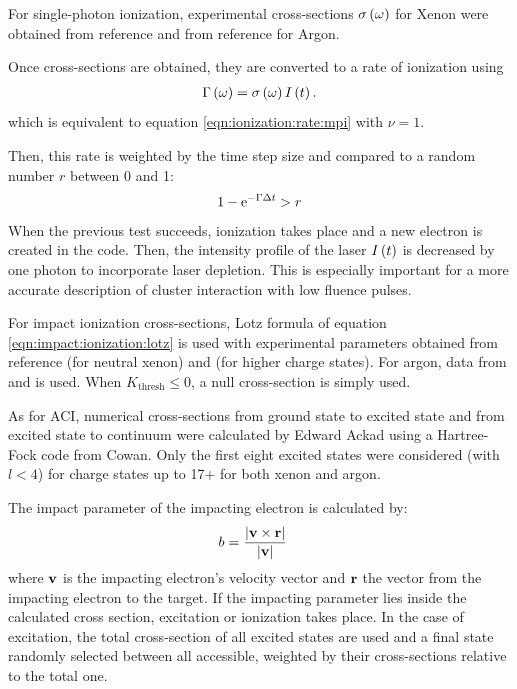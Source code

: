 
For single-photon ionization, experimental cross-sections $\sigma\left( \omega \right)$
for Xenon were obtained from reference \cite{West1978} and from
reference \cite{Marr1976} for Argon.

Once cross-sections are obtained, they are converted to a rate of ionization
using
\begin{align}
\Gamma\left( \omega \right) = \sigma\left( \omega \right) I\left( t \right).
\label{eqn:ionization:rate:single}
\end{align}
which is equivalent to equation \eqref{eqn:ionization:rate:mpi} with $\nu = 1$.

Then, this rate is weighted\cite{Lax2006} by the time step size and compared to
a random number $r$ between 0 and 1:
\begin{align}
1 - \textrm{e}^{-\Gamma \Delta t} > r
\label{eqn:ionization:prob}
\end{align}
When the previous test succeeds, ionization takes place and a new electron is
created in the code.
Then, the intensity profile of the laser $I\left( t \right)$ is decreased
by one photon
%
to incorporate laser depletion. This is especially important
for a more accurate description of cluster interaction with low fluence pulses.



For impact ionization cross-sections, Lotz formula of equation
\eqref{eqn:impact:ionization:lotz} is used with experimental parameters obtained
from reference \cite{Tawara1987} (for neutral xenon)
and \cite{Heidenreich2005} (for higher charge states).
For argon, data from \cite{Lotz1967} and \cite{Lotz1970} is used.
When $K_{\textrm{thresh}} \le 0$, a null cross-section is simply used.

As for ACI, numerical cross-sections from ground state to excited state and from
excited state to continuum were calculated by Edward Ackad using a
Hartree-Fock code from Cowan\cite{Cowan1981,CowanCode}. Only the first eight excited states
were considered (with $l<4$) for charge states up to 17+ for both xenon and argon.

The impact parameter of the impacting electron is calculated by:
\begin{align}
b & = \frac{\left| \textbf{v} \times \textbf{r} \right|}{\left| \textbf{v} \right|}
\label{eqn:ionization:impact:parameter}
\end{align}
where $\textbf{v}$ is the impacting electron's velocity vector and $\textbf{r}$ the vector
from the impacting electron to the target. If the impacting parameter lies
inside the calculated cross section, excitation or ionization takes place. In
the case of excitation, the total cross-section of all excited states are used
and a final state randomly selected between all accessible, weighted by their
cross-sections relative to the total one.

